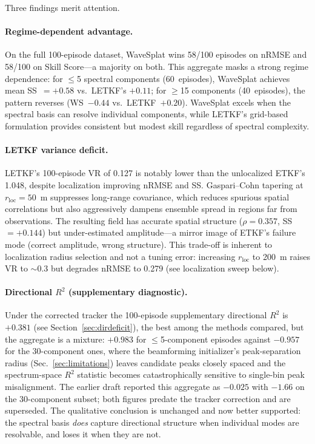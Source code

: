 Three findings merit attention.

\paragraph{Regime-dependent advantage.}
On the full 100-episode dataset, WaveSplat wins 58/100 episodes on
nRMSE and 58/100 on Skill Score---a majority on both.
This aggregate masks a strong regime dependence: for $\leq$5 spectral
components (60~episodes), WaveSplat achieves mean SS~$=+0.58$ vs.\
LETKF's $+0.11$; for $\geq$15 components (40~episodes), the pattern
reverses (WS~$-0.44$ vs.\ LETKF~$+0.20$).  WaveSplat excels when the
spectral basis can resolve individual components, while LETKF's
grid-based formulation provides consistent but modest skill regardless
of spectral complexity.

\paragraph{LETKF variance deficit.}
LETKF's 100-episode VR of 0.127 is notably lower than the unlocalized
ETKF's 1.048, despite localization improving nRMSE and SS.
Gaspari--Cohn tapering at $r_{\text{loc}}=50$~m suppresses long-range
covariance, which reduces spurious spatial correlations but also
aggressively dampens ensemble spread in regions far from observations.
The resulting field has accurate spatial structure ($\rho=0.357$,
SS~$=+0.144$) but under-estimated amplitude---a mirror image of
ETKF's failure mode (correct amplitude, wrong structure).
This trade-off is inherent to localization radius selection and not
a tuning error: increasing $r_{\text{loc}}$ to 200~m raises VR to
$\sim$0.3 but degrades nRMSE to 0.279 (see localization sweep below).

\paragraph{Directional $R^2$ (supplementary diagnostic).}
Under the corrected tracker the 100-episode supplementary directional
$R^2$ is $+0.381$ (see Section~\ref{sec:dirdeficit}), the best among the
methods compared, but the aggregate is a mixture: $+0.983$ for
$\leq$5-component episodes against $-0.957$ for the 30-component ones,
where the beamforming initializer's peak-separation radius
(Sec.~\ref{sec:limitations}) leaves candidate peaks closely spaced and the
spectrum-space $R^2$ statistic becomes catastrophically sensitive to
single-bin peak misalignment.  The earlier draft reported this aggregate as
$-0.025$ with $-1.66$ on the 30-component subset; both figures predate the
tracker correction and are superseded.  The qualitative conclusion is
unchanged and now better supported: the spectral basis \emph{does} capture
directional structure when individual modes are resolvable, and loses it
when they are not.

